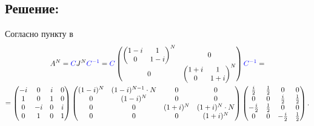 \documentclass[12pt]{article}
\begin{document}
    \subsection*{Решение:}
    Согласно пункту в
    \begin{multline*}
        A^N
        = \textcolor{blue}{C} J^N \textcolor{blue}{C^{-1}}
        = \textcolor{blue}{C}
        \begin{pmatrix}
            \begin{pmatrix}
                1 - i & 1     \\
                0     & 1 - i
            \end{pmatrix}^N & 0 \\
            0 & \begin{pmatrix}
                    1 + i & 1     \\
                    0     & 1 + i
            \end{pmatrix}^N
        \end{pmatrix}
        \textcolor{blue}{C^{-1}} = \\
        =
        \begin{pmatrix}
            -i & 0  & i & 0 \\
            1  & 0  & 1 & 0 \\
            0  & -i & 0 & i \\
            0  & 1  & 0 & 1
        \end{pmatrix}
        \begin{pmatrix}
        ( 1 - i )
            ^N & ( 1 - i )^{N-1} \cdot N & 0           & 0                   \\
            0  & ( 1 - i )^N             & 0           & 0                   \\
            0  & 0                       & ( 1 + i )^N & ( 1 + i )^N \cdot N \\
            0  & 0                       & 0           & ( 1 + i )^N
        \end{pmatrix}
        \begin{pmatrix}
            \frac{i}{2}   & \frac{1}{2} & 0            & 0           \\
            0             & 0           & \frac{i}{2}  & \frac{1}{2} \\
            - \frac{i}{2} & \frac{1}{2} & 0            & 0           \\
            0             & 0           & -\frac{i}{2} & \frac{1}{2}
        \end{pmatrix} .
    \end{multline*}
\end{document}
